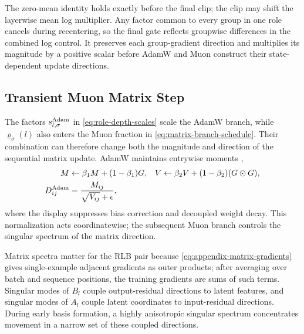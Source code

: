 \documentclass{article}
\begin{document}
The zero-mean identity holds exactly before the final clip; the clip may shift
the layerwise mean log multiplier.  Any factor common to every group in one role
cancels during recentering, so the final gate reflects groupwise differences in
the combined log control.  It preserves each group-gradient direction and
multiplies its magnitude by a positive scalar before AdamW and Muon construct
their state-dependent update directions.

\subsection{Transient Muon Matrix Step}
\label{app:matrixpolicy-muon-control}

The factors $s^{\rm Adam}_{l,\sigma}$ in
\eqref{eq:role-depth-scales} scale the AdamW branch, while
$\varrho_\sigma(l)$ also enters the Muon fraction in
\eqref{eq:matrix-branch-schedule}.  Their combination can therefore change both
the magnitude and direction of the sequential matrix update.  AdamW maintains
entrywise moments
\citep{kingma2015iclr-adam,loshchilov2019decoupled},
\begin{equation}
\begin{aligned}
    M &\leftarrow \beta_1M+(1-\beta_1)G,
    &
    V &\leftarrow \beta_2V+(1-\beta_2)(G\odot G),
    \\
    D^{\rm Adam}_{ij}
    &=
    \frac{M_{ij}}{\sqrt{V_{ij}}+\epsilon},
\end{aligned}
    \label{eq:appendix-adam-coordinate}
\end{equation}
where the display suppresses bias correction and decoupled weight decay.  This
normalization acts coordinatewise; the subsequent Muon branch controls the
singular spectrum of the matrix direction.

Matrix spectra matter for the RLB pair because
\eqref{eq:appendix-matrix-gradients} gives single-example adjacent gradients as
outer products; after averaging over batch and sequence positions, the training
gradients are sums of such terms.  Singular modes of $B_l$ couple
output-residual directions to latent features, and singular modes of $A_l$
couple latent coordinates to input-residual directions.  During early basis
formation, a highly anisotropic singular spectrum concentrates movement in a
narrow set of these coupled directions.
\end{document}
